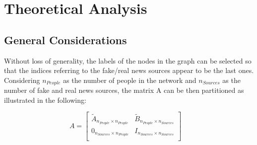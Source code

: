 \section{Theoretical Analysis}
\subsection{General Considerations}
Without loss of generality, the labels of the nodes in the graph can be selected so that the indices referring to the fake/real news sources appear to be the last ones. Considering $n_{People}$ as the number of people in the network and $n_{Sources}$ as the number of fake and real news sources, the matrix A can be then partitioned as illustrated in the following:

$$
A = 
\begin{bmatrix}
	\tilde{A}_{n_{People} \times n_{People}} & \tilde{B}_{n_{People} \times n_{Sources}} \\
	0_{n_{Sources} \times n_{People}} & I_{n_{Sources} \times n_{Sources}} \\
\end{bmatrix} 
\quad
$$

